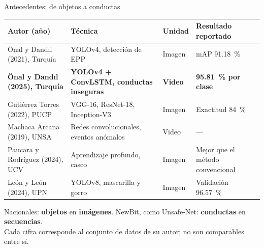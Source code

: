 \documentclass[aspectratio=169,11pt]{beamer}
\begin{document}
\begin{frame}{Antecedentes: de objetos a conductas}
\scriptsize\renewcommand{\arraystretch}{1.05}
\begin{tabularx}{\textwidth}{>{\raggedright\arraybackslash}p{4.2cm} L >{\raggedright\arraybackslash}p{1.2cm} >{\raggedright\arraybackslash}p{3.6cm}}
\toprule
Autor (año) & Técnica & Unidad & Resultado reportado\\
\midrule
Önal y Dandıl (2021), Turquía & YOLOv4, detección de EPP & Imagen & mAP 91.18~\%\\
\textbf{Önal y Dandıl (2025), Turquía} & \textbf{YOLOv4 + ConvLSTM, conductas inseguras} & \textbf{Video} & \textbf{95.81~\% por clase}\\
Gutiérrez Torres (2022), PUCP & VGG-16, ResNet-18, Inception-V3 & Imagen & Exactitud 84~\%\\
Machaca Arcana (2019), UNSA & Redes convolucionales, eventos anómalos & Video & —\\
Paucara y Rodríguez (2024), UCV & Aprendizaje profundo, casco & Imagen & Mejor que el método convencional\\
León y León (2024), UPN & YOLOv8, mascarilla y gorro & Imagen & Validación 96.57~\%\\
\bottomrule
\end{tabularx}
\vspace{0.25cm}

\small Nacionales: \textbf{objetos} en \textbf{imágenes}. NewBit, como Unsafe-Net: \textbf{conductas} en \textbf{secuencias}.\\[2pt]
{\color{gris}\scriptsize Cada cifra corresponde al conjunto de datos de su autor; no son comparables entre sí.}
\end{frame}
\end{document}
